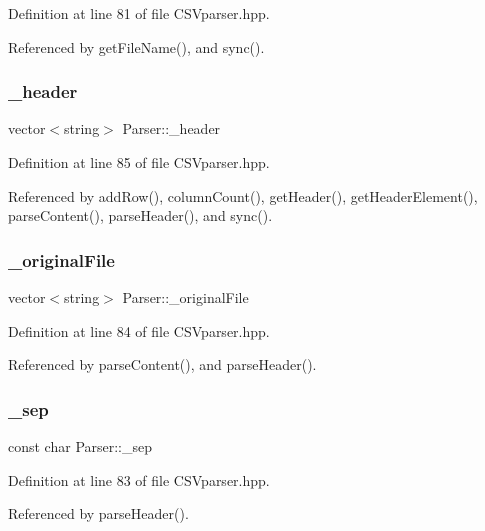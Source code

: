Definition at line 81 of file C\+S\+Vparser.\+hpp.



Referenced by get\+File\+Name(), and sync().

\mbox{\label{class_parser_aa4b3a567bac767923745b4bd2f176c6f}} 
\subsubsection{\_header}
{\footnotesize\ttfamily vector$<$string$>$ Parser\+::\+\_\+header\hspace{0.3cm}{\ttfamily [private]}}



Definition at line 85 of file C\+S\+Vparser.\+hpp.



Referenced by add\+Row(), column\+Count(), get\+Header(), get\+Header\+Element(), parse\+Content(), parse\+Header(), and sync().

\mbox{\label{class_parser_abecadd4e857d14479da2fa7ec344f21b}} 
\subsubsection{\_originalFile}
{\footnotesize\ttfamily vector$<$string$>$ Parser\+::\+\_\+original\+File\hspace{0.3cm}{\ttfamily [private]}}



Definition at line 84 of file C\+S\+Vparser.\+hpp.



Referenced by parse\+Content(), and parse\+Header().

\mbox{\label{class_parser_ae09c229a5f86b536e11fe4f1a3274317}} 
\subsubsection{\_sep}
{\footnotesize\ttfamily const char Parser\+::\+\_\+sep\hspace{0.3cm}{\ttfamily [private]}}



Definition at line 83 of file C\+S\+Vparser.\+hpp.



Referenced by parse\+Header().

